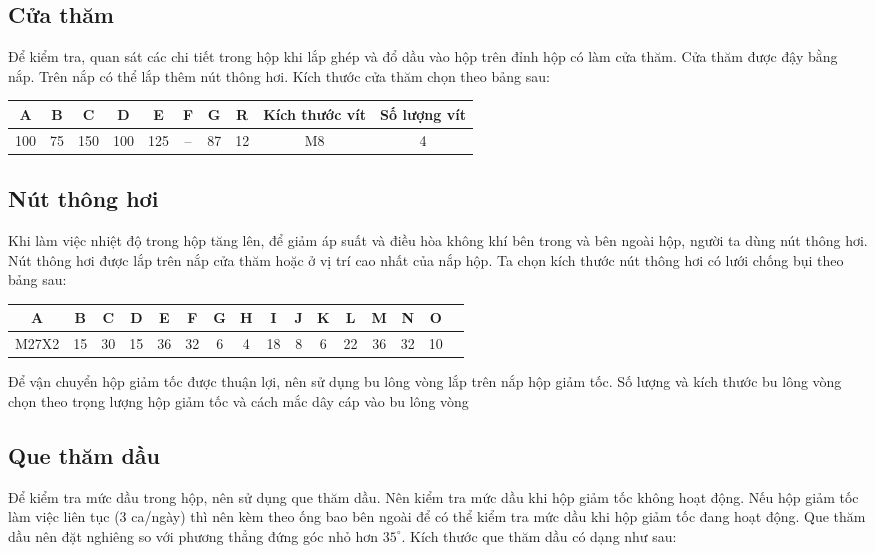 \subsection{Cửa thăm}
Để kiểm tra, quan sát các chi tiết trong hộp khi lắp ghép và đổ dầu vào hộp trên đỉnh hộp có làm cửa thăm. Cửa thăm được đậy bằng nắp. Trên nắp có thể lắp thêm nút thông hơi. Kích thước cửa thăm chọn theo bảng sau:

\begin{table}[H]
\centering
\begin{tabular}{|c|c|c|c|c|c|c|c|c|c|}
\hline
\textbf{A} & \textbf{B} & \textbf{C} & \textbf{D} & \textbf{E} & \textbf{F} & \textbf{G} & \textbf{R} & \textbf{Kích thước vít} & \textbf{Số lượng vít} \\ \hline
100 & 75 & 150 & 100 & 125 & -- & 87 & 12 & M8 & 4 \\ \hline
\end{tabular}
\end{table}

\subsection{Nút thông hơi}
Khi làm việc nhiệt độ trong hộp tăng lên, để giảm áp suất và điều hòa không khí bên trong và bên ngoài hộp, người ta dùng nút thông hơi. Nút thông hơi được lắp trên nắp cửa thăm hoặc ở vị trí cao nhất của nắp hộp. Ta chọn kích thước nút thông hơi có lưới chống bụi theo bảng sau:

\begin{table}[H]
\centering
\begin{tabular}{|c|c|c|c|c|c|c|c|c|c|c|c|c|c|c|c|}
\hline
\textbf{A} & \textbf{B} & \textbf{C} & \textbf{D} & \textbf{E} & \textbf{F} & \textbf{G} & \textbf{H} & \textbf{I} & \textbf{J} & \textbf{K} & \textbf{L} & \textbf{M} & \textbf{N} & \textbf{O} \\ \hline
M27X2 & 15 & 30 & 15 & 36 & 32 & 6 & 4 & 18 & 8 & 6 & 22 & 36 & 32 & 10 \\ \hline
\end{tabular}
\end{table}
Để vận chuyển hộp giảm tốc được thuận lợi, nên sử dụng bu lông vòng lắp trên
nắp hộp giảm tốc. Số lượng và kích thước bu lông vòng chọn theo trọng lượng hộp
giảm tốc và cách mắc dây cáp vào bu lông vòng

\subsection{Que thăm dầu}
Để kiểm tra mức dầu trong hộp, nên sử dụng que thăm dầu. Nên kiểm tra mức dầu khi hộp giảm tốc không hoạt động. Nếu hộp giảm tốc làm việc liên tục (3 ca/ngày) thì nên kèm theo ống bao bên ngoài để có thể kiểm tra mức dầu khi hộp giảm tốc đang hoạt động. Que thăm dầu nên đặt nghiêng so với phương thẳng đứng góc nhỏ hơn $35^\circ$. Kích thước que thăm dầu có dạng như sau:

